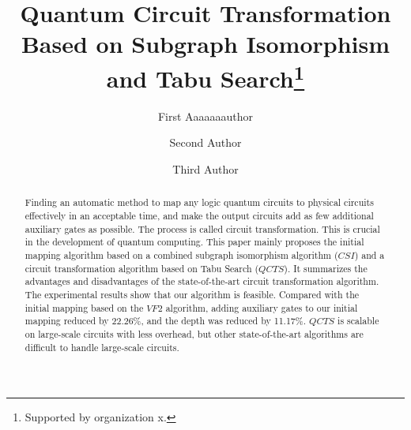 \documentclass[runningheads]{llncs}
\begin{document}
%
\title{Quantum Circuit Transformation Based on Subgraph Isomorphism and Tabu Search\thanks{Supported by organization x.}}
%
%
\author{First Aaaaaaauthor \and
Second Author \and
Third Author}
%
%
%
\maketitle              %
%
\begin{abstract}
	Finding an automatic method to map any logic quantum circuits to physical circuits effectively in an acceptable time, and make the output circuits add as few additional auxiliary gates as possible. The process is called circuit transformation. This is crucial in the development of quantum computing. This paper mainly proposes the initial mapping algorithm based on a combined subgraph isomorphism algorithm ($CSI$) and a circuit transformation algorithm based on Tabu Search ($QCTS$). It summarizes the advantages and disadvantages of the state-of-the-art circuit transformation algorithm. The experimental results show that our algorithm is feasible. Compared with the initial mapping based on the $VF2$ algorithm, adding auxiliary gates to our initial mapping reduced by 22.26\%, and the depth was reduced by 11.17\%. $QCTS$ is scalable on large-scale circuits with less overhead, but other state-of-the-art algorithms are difficult to handle large-scale circuits.
\end{abstract}
\end{document}
